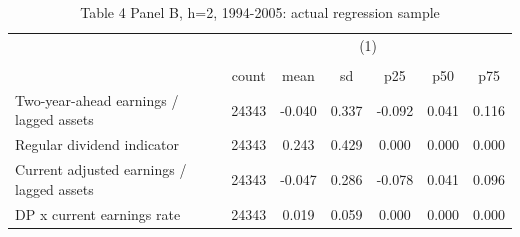 \begin{table}[htbp]\centering
\def\sym#1{\ifmmode^{#1}\else\(^{#1}\)\fi}
\caption{Table 4 Panel B, h=2, 1994-2005: actual regression sample}
\begin{tabular}{l*{1}{cccccc}}
\hline\hline
                    &\multicolumn{6}{c}{(1)}                                                      \\
                    &\multicolumn{6}{c}{}                                                         \\
                    &       count&        mean&          sd&         p25&         p50&         p75\\
\hline
Two-year-ahead earnings / lagged assets&       24343&      -0.040&       0.337&      -0.092&       0.041&       0.116\\
Regular dividend indicator&       24343&       0.243&       0.429&       0.000&       0.000&       0.000\\
Current adjusted earnings / lagged assets&       24343&      -0.047&       0.286&      -0.078&       0.041&       0.096\\
DP x current earnings rate&       24343&       0.019&       0.059&       0.000&       0.000&       0.000\\
\hline\hline
\end{tabular}
\end{table}
